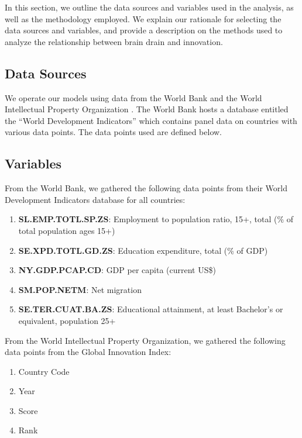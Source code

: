 \documentclass[12pt]{article}
\begin{document}
In this section, we outline the data sources and variables used in the analysis, as well as the methodology employed. We explain our rationale for selecting the data sources and variables, and provide a description on the methods used to analyze the relationship between brain drain and innovation.

\subsection{Data Sources} \label{data-sources}

We operate our models using data from the World Bank \nocite{worldbankwdi} and the World Intellectual Property Organization \nocite{gii2022}.
The World Bank hosts a database entitled the ``World Development Indicators'' which contains panel data on countries with various data points.
The data points used are defined below.

\subsection{Variables} \label{data-variables}
From the World Bank, we gathered the following data points from their World Development Indicators database for all countries:

\begin{enumerate}
    \item \textbf{SL.EMP.TOTL.SP.ZS}: Employment to population ratio, 15+, total (\% of total population ages 15+)
    \item \textbf{SE.XPD.TOTL.GD.ZS}: Education expenditure, total (\% of GDP)
    \item \textbf{NY.GDP.PCAP.CD}: GDP per capita (current US\$)
    \item \textbf{SM.POP.NETM}: Net migration
    \item \textbf{SE.TER.CUAT.BA.ZS}: Educational attainment, at least Bachelor's or equivalent, population 25+
\end{enumerate}

From the World Intellectual Property Organization, we gathered the following data points from the Global Innovation Index:
\begin{enumerate}
    \item Country Code
    \item Year
    \item Score
    \item Rank
\end{enumerate}
\end{document}
